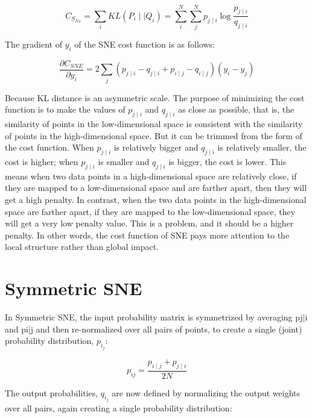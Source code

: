 \begin{equation*}
    {C_S_N_E} = {\sum_i KL(P_i \mid \mid Q_i)} =  { {\sum_i^N} {\sum_j^N} {p_{j\mid i}} \log \frac{p_{j\mid i}}{q_{j\mid i}} }
\end{equation*}

\noindent The gradient of $y_i$ of the SNE cost function is as follows:

\begin{equation*}
\frac{\partial C_{SNE}}{\partial y_i} = 2\sum_j(p_{j \mid i} - q_{j \mid i} + p_{i \mid j} - q_{i \mid j} )(y_i - y_j)
\end{equation*}

\noindent Because KL distance is an asymmetric scale. The purpose of minimizing the cost function is to make the values of $p_{j∣i}$ and $q_{j∣i}$ as close as possible,  that is, the similarity of points in the low-dimensional space is consistent with the similarity of points in the high-dimensional space. But it can be trimmed from the form of the cost function. When $p_{j∣i}$ is relatively bigger and $q_{j∣i}$  is relatively smaller, the cost is higher; when $p_{j∣i}$ is smaller and $q_{j∣i}$ is bigger, the cost is lower. This means when two data points in a high-dimensional space are relatively close, if they are mapped to a low-dimensional space and are farther apart, then they will get a high penalty. In contrast, when the two data points in the high-dimensional space are farther apart, if they are mapped to the low-dimensional space, they will get a very low penalty value. This is a problem, and it should be a higher penalty. In other words, the cost function of SNE pays more attention to the local structure rather than global impact.

\section{Symmetric SNE}
In Symmetric SNE, the input probability matrix is symmetrized by averaging pj|i and pi|j and then re-normalized over all pairs of points, to create a single (joint) probability distribution, $p_i_j$:

\begin{equation*}
    {p_{i j}} = \frac {p_{i\mid j} + p_{j\mid i}} {2N}
\end{equation*}

\noindent The output probabilities, $q_i_j$ are now defined by normalizing the output weights over all pairs, again creating a single probability distribution:

